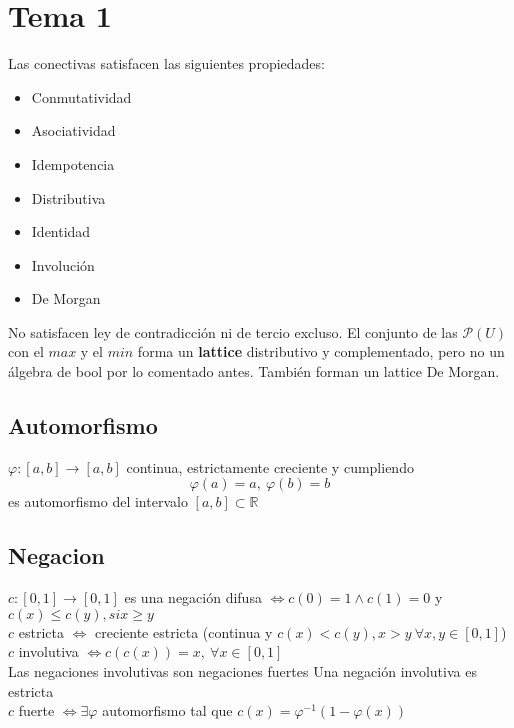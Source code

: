 \documentclass[paper=a4, fontsize=11pt]{scrartcl} %
\begin{document}


\section{Tema 1}
Las conectivas satisfacen las siguientes propiedades:
\begin{itemize}
\item Conmutatividad
\item Asociatividad
\item Idempotencia
\item Distributiva
\item Identidad
\item Involución
\item De Morgan
\end{itemize}
No satisfacen ley de contradicción ni de tercio excluso. El conjunto de las $\mathcal{P}(U)$ con el $max$ y el $min$ forma un \textbf{lattice} distributivo y complementado, pero no un álgebra de bool por lo comentado antes. También forman un lattice De Morgan.
\subsection{Automorfismo}
$\varphi :[a,b]\rightarrow [a,b]$ continua, estrictamente creciente y cumpliendo $$\varphi (a)=a,\ \varphi (b)=b$$ es automorfismo del intervalo $[a,b]\subset\mathbb{R}$

\subsection{Negacion}
$c:[0,1]\rightarrow[0,1]$ es una negación difusa $\iff c(0)=1 \land c(1)=0$ y $c(x)\leq c(y), si x\geq y$\\
$c$ estricta $\iff$ creciente estricta (continua y $c(x)<c(y), x>y\  \forall x,y \in [0,1]$)\\
$c$ involutiva $\iff c(c(x))=x,\ \forall x \in [0,1]$\\
Las negaciones involutivas son negaciones fuertes Una negación involutiva es estricta\\
$c$ fuerte $\iff\exists\varphi$ automorfismo tal que $c(x)=\varphi^{-1}(1-\varphi(x))$
\end{document}
